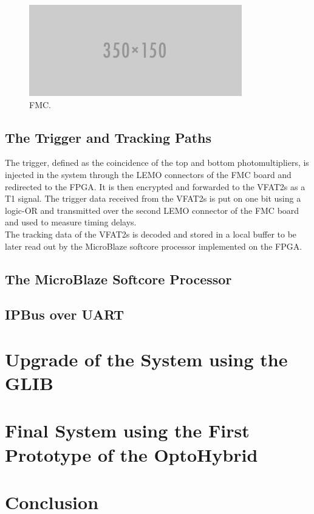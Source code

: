       \begin{figure}[h!]
        \centering
        \includegraphics[width=\textwidth]{img/empty.png}
        \caption{FMC.}
        \label{fig:III-1-fmc}
      \end{figure}

    \subsection{The Trigger and Tracking Paths}

      The trigger, defined as the coincidence of the top and bottom photomultipliers, is injected in the system through the LEMO connectors of the FMC board and redirected to the FPGA. It is then encrypted and forwarded to the VFAT2s as a T1 signal. The trigger data received from the VFAT2s is put on one bit using a logic-OR and transmitted over the second LEMO connector of the FMC board and used to measure timing delays. \\

      The tracking data of the VFAT2s is decoded and stored in a local buffer to be later read out by the MicroBlaze softcore processor implemented on the FPGA.

    \subsection{The MicroBlaze Softcore Processor}

    \subsection{IPBus over UART}

  \section{Upgrade of the System using the GLIB}

  \section{Final System using the First Prototype of the OptoHybrid}

























  \section{Conclusion}
